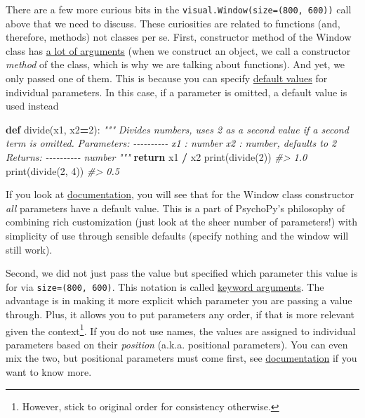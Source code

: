 \documentclass[
]{book}
\newenvironment{Shaded}{\begin{snugshade}}{\end{snugshade}}
\newcommand{\BuiltInTok}[1]{#1}
\newcommand{\CommentTok}[1]{\textcolor[rgb]{0.56,0.35,0.01}{\textit{#1}}}
\newcommand{\ControlFlowTok}[1]{\textcolor[rgb]{0.13,0.29,0.53}{\textbf{#1}}}
\newcommand{\DecValTok}[1]{\textcolor[rgb]{0.00,0.00,0.81}{#1}}
\newcommand{\KeywordTok}[1]{\textcolor[rgb]{0.13,0.29,0.53}{\textbf{#1}}}
\newcommand{\NormalTok}[1]{#1}
\newcommand{\OperatorTok}[1]{\textcolor[rgb]{0.81,0.36,0.00}{\textbf{#1}}}
\begin{document}
There are a few more curious bits in the \texttt{visual.Window(size=(800,\ 600))} call above that we need to discuss. These curiosities are related to functions (and, therefore, methods) not classes per se. First, constructor method of the Window class has \href{https://psychopy.org/api/visual/window.html\#psychopy.visual.Window}{a lot of arguments} (when we construct an object, we call a constructor \emph{method} of the class, which is why we are talking about functions). And yet, we only passed one of them. This is because you can specify \href{https://docs.python.org/3/tutorial/controlflow.html\#default-argument-values}{default values} for individual parameters. In this case, if a parameter is omitted, a default value is used instead

\begin{Shaded}
\begin{Highlighting}[]
\KeywordTok{def}\NormalTok{ divide(x1, x2}\OperatorTok{=}\DecValTok{2}\NormalTok{):}
  \CommentTok{"""}
\CommentTok{  Divides numbers, uses 2 as a second value if a second term is omitted.}
\CommentTok{  }
\CommentTok{  Parameters:}
\CommentTok{  {-}{-}{-}{-}{-}{-}{-}{-}{-}{-}}
\CommentTok{  x1 : number}
\CommentTok{  x2 : number, defaults to 2}
\CommentTok{  }
\CommentTok{  Returns:}
\CommentTok{  {-}{-}{-}{-}{-}{-}{-}{-}{-}{-}}
\CommentTok{  number}
\CommentTok{  """}
  \ControlFlowTok{return}\NormalTok{ x1 }\OperatorTok{/}\NormalTok{ x2}
\BuiltInTok{print}\NormalTok{(divide(}\DecValTok{2}\NormalTok{))}
\CommentTok{\#\textgreater{} 1.0}
\BuiltInTok{print}\NormalTok{(divide(}\DecValTok{2}\NormalTok{, }\DecValTok{4}\NormalTok{))}
\CommentTok{\#\textgreater{} 0.5}
\end{Highlighting}
\end{Shaded}

If you look at \href{https://psychopy.org/api/visual/window.html\#psychopy.visual.Window}{documentation}, you will see that for the Window class constructor \emph{all} parameters have a default value. This is a part of PsychoPy's philosophy of combining rich customization (just look at the sheer number of parameters!) with simplicity of use through sensible defaults (specify nothing and the window will still work).

Second, we did not just pass the value but specified which parameter this value is for via \texttt{size=(800,\ 600)}. This notation is called \href{https://docs.python.org/3/tutorial/controlflow.html\#keyword-arguments}{keyword arguments}. The advantage is in making it more explicit which parameter you are passing a value through. Plus, it allows you to put parameters any order, if that is more relevant given the context\footnote{However, stick to original order for consistency otherwise.}. If you do not use names, the values are assigned to individual parameters based on their \emph{position} (a.k.a. positional parameters). You can even mix the two, but positional parameters must come first, see \href{https://docs.python.org/3/tutorial/controlflow.html\#more-on-defining-functions}{documentation} if you want to know more.
\end{document}
